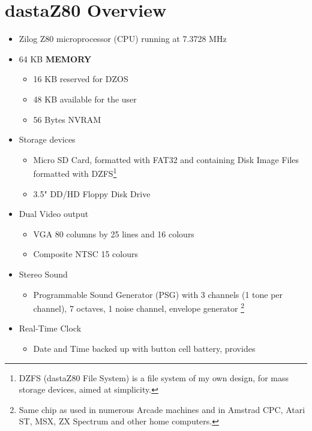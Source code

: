 \documentclass[a4paper,11pt]{article}
\begin{document}
    \section{dastaZ80 Overview}
    \begin{itemize}
        \item Zilog Z80 microprocessor (CPU) running at 7.3728 MHz
        \item 64 KB \textbf{MEMORY}
        \begin{itemize}
            \item 16 KB reserved for DZOS
            \item 48 KB available for the user
            \item 56 Bytes NVRAM
        \end{itemize}
        \item Storage devices
        \begin{itemize}
            \item Micro SD Card, formatted with FAT32 and containing Disk Image
            Files formatted with DZFS\footnote{DZFS (dastaZ80 File System) is a
            file system of my own design, for mass storage devices, aimed at
            simplicity.}
            \item 3.5" DD/HD Floppy Disk Drive
        \end{itemize}
        \item Dual Video output
        \begin{itemize}
            \item VGA 80 columns by 25 lines and 16 colours
            \item Composite NTSC 15 colours
        \end{itemize}
        \item Stereo Sound
        \begin{itemize}
            \item Programmable Sound Generator (PSG) with 3 channels (1 tone
            per channel), 7 octaves, 1 noise channel, envelope generator
            \footnote{Same chip as used in numerous Arcade machines and in
            Amstrad CPC, Atari ST, MSX, ZX Spectrum and other home computers.}
        \end{itemize}
        \item Real-Time Clock
        \begin{itemize}
            \item Date and Time backed up with button cell battery, provides

\end{itemize}
\end{itemize}
\end{document}
